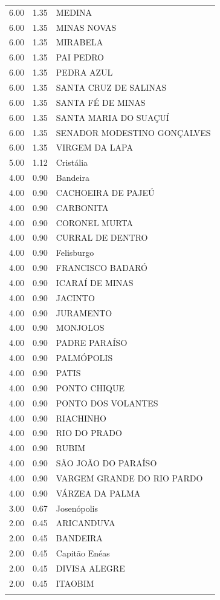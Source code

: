 \documentclass[a4paper, 12pt, openright, oneside, english, brazil, article]{abntex2}
\begin{document}
\begin{scriptsize}
\begin{longtable}{rrl}
			6.00 & 1.35 & MEDINA \\ 
			6.00 & 1.35 & MINAS NOVAS \\ 
			6.00 & 1.35 & MIRABELA \\ 
			6.00 & 1.35 & PAI PEDRO \\ 
			6.00 & 1.35 & PEDRA AZUL \\ 
			6.00 & 1.35 & SANTA CRUZ DE SALINAS \\ 
			6.00 & 1.35 & SANTA FÉ DE MINAS \\ 
			6.00 & 1.35 & SANTA MARIA DO SUAÇUÍ \\ 
			6.00 & 1.35 & SENADOR MODESTINO GONÇALVES \\ 
			6.00 & 1.35 & VIRGEM DA LAPA \\ 
			5.00 & 1.12 & Cristália \\ 
			4.00 & 0.90 & Bandeira \\ 
			4.00 & 0.90 & CACHOEIRA DE PAJEÚ \\ 
			4.00 & 0.90 & CARBONITA \\ 
			4.00 & 0.90 & CORONEL MURTA \\ 
			4.00 & 0.90 & CURRAL DE DENTRO \\ 
			4.00 & 0.90 & Felisburgo \\ 
			4.00 & 0.90 & FRANCISCO BADARÓ \\ 
			4.00 & 0.90 & ICARAÍ DE MINAS \\ 
			4.00 & 0.90 & JACINTO \\ 
			4.00 & 0.90 & JURAMENTO \\ 
			4.00 & 0.90 & MONJOLOS \\ 
			4.00 & 0.90 & PADRE PARAÍSO \\ 
			4.00 & 0.90 & PALMÓPOLIS \\ 
			4.00 & 0.90 & PATIS \\ 
			4.00 & 0.90 & PONTO CHIQUE \\ 
			4.00 & 0.90 & PONTO DOS VOLANTES \\ 
			4.00 & 0.90 & RIACHINHO \\ 
			4.00 & 0.90 & RIO DO PRADO \\ 
			4.00 & 0.90 & RUBIM \\ 
			4.00 & 0.90 & SÃO JOÃO DO PARAÍSO \\ 
			4.00 & 0.90 & VARGEM GRANDE DO RIO PARDO \\ 
			4.00 & 0.90 & VÁRZEA DA PALMA \\ 
			3.00 & 0.67 & Josenópolis \\ 
			2.00 & 0.45 & ARICANDUVA \\ 
			2.00 & 0.45 & BANDEIRA \\ 
			2.00 & 0.45 & Capitão Enéas \\ 
			2.00 & 0.45 & DIVISA ALEGRE \\ 
			2.00 & 0.45 & ITAOBIM \\ 
			\hline
			\hline
			\label{semoutorga}
		\end{longtable}
	\end{scriptsize}	
	
\end{document}
